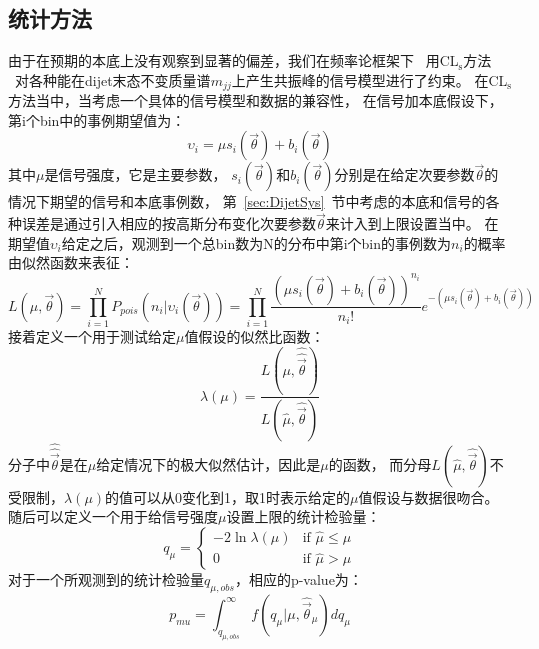 \subsection{统计方法} 
\label{sec:DijetSig1}
由于在预期的本底上没有观察到显著的偏差，我们在频率论框架下~\cite{Baak:2014wma}
用CL$_\text{s}$方法 ~\cite{Read:2002hq}对各种能在dijet末态不变质量谱$m_{jj}$上产生共振峰的信号模型进行了约束。
在CL$_\text{s}$方法当中，当考虑一个具体的信号模型和数据的兼容性，
在信号加本底假设下，第i个bin中的事例期望值为：
\begin{equation} 
\label{eq:Limit1}
\upsilon_i=\mu s_i(\vec{\theta}) + b_i (\vec{\theta})
\end{equation}
其中$\mu$是信号强度，它是主要参数，
$s_i(\vec{\theta})$和$b_i (\vec{\theta})$分别是在给定次要参数$\vec{\theta}$的情况下期望的信号和本底事例数，
第~\ref{sec:DijetSys}~节中考虑的本底和信号的各种误差是通过引入相应的按高斯分布变化次要参数$\vec{\theta}$来计入到上限设置当中。
在期望值$\upsilon_i$给定之后，观测到一个总bin数为N的分布中第i个bin的事例数为$n_i$的概率由似然函数来表征：
\begin{equation} 
\label{eq:Limit2}
L(\mu,\vec{\theta})= \prod^N_{i=1} P_{pois}(n_i|\upsilon_i(\vec{\theta})) 
=\prod^N_{i=1} \frac{(\mu s_i(\vec{\theta}) + b_i (\vec{\theta}))^{n_i}}{n_i !} e^{-(\mu s_i(\vec{\theta}) + b_i (\vec{\theta}))}
\end{equation}
接着定义一个用于测试给定$\mu$值假设的似然比函数：
\begin{equation} 
\label{eq:Limit3}
\lambda(\mu)=\frac{L(\mu,\hat{\hat{\vec{\theta}}})}{L(\hat{\mu},\hat{\vec{\theta}})}
\end{equation}
分子中$\hat{\hat{\vec{\theta}}}$是在$\mu$给定情况下的极大似然估计，因此是$\mu$的函数，
而分母$L(\hat{\mu},\hat{\vec{\theta}})$不受限制，$\lambda(\mu)$的值可以从0变化到1，取1时表示给定的$\mu$值假设与数据很吻合。
随后可以定义一个用于给信号强度$\mu$设置上限的统计检验量：
\begin{equation} 
\label{eq:Limit4}
q_{\mu} =
    \begin{cases}
      -2\ln \lambda(\mu) & \text{if $\hat{\mu} \le \mu$} \\
      0 & \text{if $\hat{\mu} > \mu$}
    \end{cases}  
\end{equation}
对于一个所观测到的统计检验量$q_{\mu,obs}$，相应的p-value为：
\begin{equation} 
\label{eq:Limit5}
p_{mu}=\int^{\infty}_{q_{\mu,obs}} f\left(   q_{\mu}|\mu, \hat{\vec{\theta}}_{\mu}   \right) dq_{\mu}
\end{equation}
